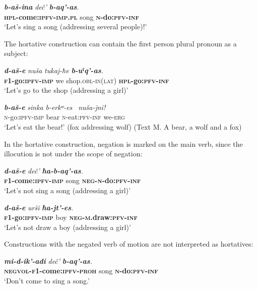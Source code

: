 ﻿\documentclass[output=paper]{langsci/langscibook}
\begin{document}
\ea %
\gll \emph{\textbf{b-aš-ina}} \emph{deč'}  \emph{\textbf{b-aq'-as}.}\\
 \textbf{\textsc{hpl}-come:\textsc{ipfv}-\textsc{imp}.\textsc{pl}} song  \textbf{\textsc{n}-do:\textsc{pfv}-\textsc{inf}}\\
\glt `Let's sing a song (addressing several people)!'
\z

The hortative construction can contain the first person plural pronoun
as a subject:

\ea %
\gll \emph{\textbf{d-aš-e}} \emph{nuša} \emph{tukaj-ħe}  \emph{\textbf{b-uˤq'-as}.}\\
 \textbf{\textsc{f1}-go:\textsc{ipfv}-\textsc{imp}} we shop.\textsc{obl}-\textsc{in}(\textsc{lat})  \textbf{\textsc{hpl}-go:\textsc{pfv}-\textsc{inf}}\\
\glt `Let's go to the shop (addressing a girl)'

\ex %
\gll \emph{\textbf{b-aš-e}} \emph{sinka} \emph{b-erkʷ-es~}  \emph{nuša-jni!}\\
 \textsc{n}-go:\textsc{ipfv}-\textsc{imp} bear \textsc{n}-eat:\textsc{pfv}-\textsc{inf} we-\textsc{erg}\\
\glt `Let's eat the bear!' (fox addressing wolf) (Text M. A bear, a wolf and
a fox)
\z

In the hortative construction, negation is marked on the main verb, since
the illocution is not under the scope of negation:

\ea %
\gll \emph{\textbf{d-aš-e}} \emph{deč'}  \emph{\textbf{ħa-b-aq'-as}.}\\
 \textbf{\textsc{f1}-come:\textsc{ipfv}-\textsc{imp}} song \textbf{\textsc{neg}-\textsc{n}-do:\textsc{pfv}-\textsc{inf}}\\
\glt `Let's not sing a song (addressing a girl)'

\ex %
\gll \emph{\textbf{d-aš-e}} \emph{urši} \emph{\textbf{ħa-jt'-es}.}\\
 \textbf{\textsc{f1}-go:\textsc{ipfv}-\textsc{imp}} boy \textbf{\textsc{neg}-\textsc{m}.draw:\textsc{pfv}-\textsc{inf}}\\
\glt `Let's not draw a boy (addressing a girl)'
\z

Constructions with the negated verb of motion are not interpreted as
hortatives:

\ea %
\gll \emph{\textbf{mi-d-ik'-adi}} \emph{deč'} \emph{\textbf{b-aq'-as}.}\\
 \textbf{\textsc{negvol}-\textsc{f1}-come:\textsc{ipfv}-\textsc{proh}} song \textbf{\textsc{n}-do:\textsc{pfv}-\textsc{inf}}\\
 \glt `Don't come to sing a song.'
\z
\end{document}

